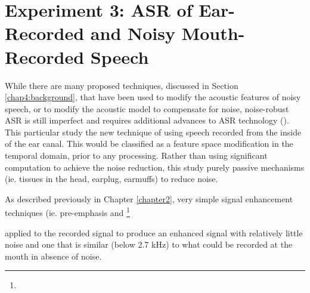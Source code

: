 % 
% 
% 
% 
% 





\section{Experiment 3: ASR of Ear-Recorded and Noisy Mouth-Recorded Speech}\label{expt3}

While there are many proposed techniques, discussed in Section \ref{chap4:background}, that have been used to modify the acoustic features of noisy speech, or to modify the acoustic model to compensate for noise, noise-robust ASR is still imperfect and requires additional advances to ASR technology (\cite{zhang:17}).  This particular study \DIFdelbegin {}\DIFdelend \DIFaddbegin {}\DIFaddend the new technique of using speech recorded from the inside of the ear canal.  This would be classified as a feature space modification in the temporal domain, prior to any processing.  Rather than using significant computation to achieve the noise reduction, this study \DIFdelbegin {}\DIFdelend \DIFaddbegin {}\DIFaddend purely passive mechanisms (ie. tissues in the head, earplug, earmuffs) to reduce noise.  

As described previously in Chapter \ref{chapter2}, very simple signal enhancement techniques (ie. pre-emphasis and \DIFdelbegin {}\footnote{} %
\addtocounter{footnote}{-1}%
\DIFdelend \DIFaddbegin {}\DIFaddend applied to the recorded signal to produce an enhanced signal with relatively little noise and one that is \DIFdelbegin {}\DIFdelend similar (below 2.7 kHz) to what could be recorded at the mouth in absence of noise.  \DIFaddbegin {}\DIFaddend 

